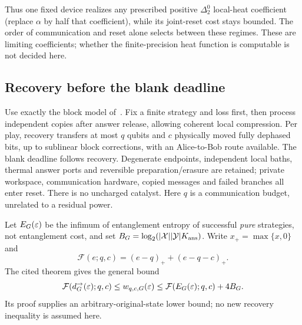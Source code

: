 Thus one fixed device realizes any prescribed positive $\Delta^0_2$ local-heat coefficient (replace $\alpha$ by half that coefficient), while its joint-reset cost stays bounded. The order of communication and reset alone selects between these regimes. These are limiting coefficients; whether the finite-precision heat function is computable is not decided here.

\subsection{Recovery before the blank deadline}\label{sec:recovery-threshold}
Use exactly the block model of~\cite[Section~4, Theorem~4.1 and Lemma~4.2]{DM-heat}. Fix a finite strategy and loss first, then process independent copies after answer release, allowing coherent local compression. Per play, recovery transfers at most $q$ qubits and $c$ physically moved fully dephased bits, up to sublinear block corrections, with an Alice-to-Bob route available. The blank deadline follows recovery. Degenerate endpoints, independent local baths, thermal answer ports and reversible preparation/erasure are retained; private workspace, communication hardware, copied messages and failed branches all enter reset. There is no uncharged catalyst. Here $q$ is a communication budget, unrelated to a residual power.

Let $E_G(\varepsilon)$ be the infimum of entanglement entropy of successful \emph{pure} strategies, not entanglement cost, and set $B_G=\log_2(|\mathcal X||\mathcal Y|K_{\rm ans})$. Write $x_+=\max\{x,0\}$ and
\[
 \mathcal F(e;q,c)=(e-q)_++(e-q-c)_+.
\]
The cited theorem gives the general bound
\begin{equation}\label{eq:recovery-import}
 \mathcal F(d^\to_G(\varepsilon);q,c)\le w_{q,c,G}(\varepsilon)
 \le\mathcal F(E_G(\varepsilon);q,c)+4B_G.
\end{equation}
Its proof supplies an arbitrary-original-state lower bound; no new recovery inequality is assumed here.

